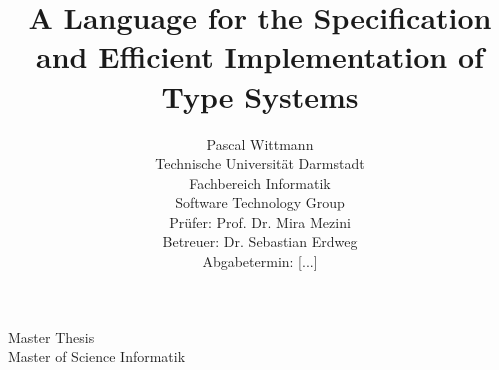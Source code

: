\documentclass[a4paper,twoside]{report}
\begin{document}

\begin{center}
  Master Thesis \\
  Master of Science Informatik
\end{center}

\title{A Language for the Specification and Efficient Implementation
  of Type Systems}
\author{
Pascal Wittmann \\[6cm]
\small Technische Universität Darmstadt \\
\small Fachbereich Informatik \\
\small Software Technology Group \\[0.5cm]
\small Prüfer: Prof. Dr. Mira Mezini \\
\small Betreuer: Dr. Sebastian Erdweg \\[0.5cm]
\small Abgabetermin: [...]
}
\date{} %

\begingroup
\let\newpage\relax %
\maketitle
\endgroup
\end{document}
